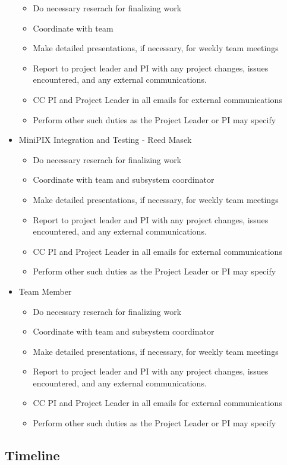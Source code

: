 \begin{itemize}
\begin{itemize}
	\item Do necessary reserach for finalizing work
	\item Coordinate with team
	\item Make detailed presentations, if necessary, for weekly team meetings
	\item Report to project leader and PI with any project changes, issues encountered, and any external communications.
	\item CC PI and Project Leader in all emails for external communications
	\item Perform other such duties as the Project Leader or PI may specify
	\end{itemize}
\item MiniPIX Integration and Testing - Reed Masek
	\begin{itemize}
	\item Do necessary reserach for finalizing work
	\item Coordinate with team and subsystem coordinator	
	\item Make detailed presentations, if necessary, for weekly team meetings
	\item Report to project leader and PI with any project changes, issues encountered, and any external communications.
	\item CC PI and Project Leader in all emails for external communications
	\item Perform other such duties as the Project Leader or PI may specify
	\end{itemize}
\item Team Member
	\begin{itemize}
	\item Do necessary reserach for finalizing work
	\item Coordinate with team and subsystem coordinator
	\item Make detailed presentations, if necessary, for weekly team meetings
	\item Report to project leader and PI with any project changes, issues encountered, and any external communications.
	\item CC PI and Project Leader in all emails for external communications
	\item Perform other such duties as the Project Leader or PI may specify
	\end{itemize}
\end{itemize}
		 
\subsection{Timeline}
\label{sec:Timeline}

